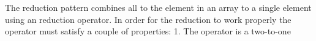 The reduction pattern combines all to the element in an array to a single element using an reduction operator. In order for the reduction to work properly the operator must satisfy a couple of properties: 
1. The operator is a two-to-one 